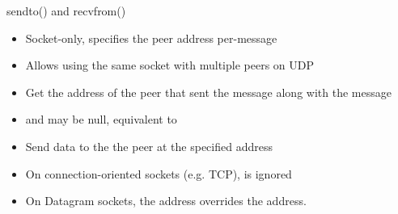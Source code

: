 \begin{frame}{sendto() and recvfrom()}
	\begin{itemize}
		\item Socket-only, specifies the peer address per-message
		\item Allows using the same socket with multiple peers on UDP
	\end{itemize}
	\begin{itemize}
		\item Get the address of the peer that sent the message along with the message
		\item {} and  may be null, equivalent to 
	\end{itemize}
	\vspace{0.5cm}
	\begin{itemize}
		\item Send data to the the peer at the specified address
		\item On connection-oriented sockets (e.g. TCP),  is ignored
		\item On Datagram sockets, the address overrides the  address.
	\end{itemize}

\end{frame}

